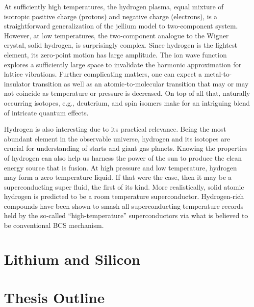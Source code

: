 At sufficiently high temperatures, the hydrogen plasma, equal mixture of isotropic positive charge (protons) and negative charge (electrons), is a straightforward generalization of the jellium model to two-component system. However, at low temperatures, the two-component analogue to the Wigner crystal, solid hydrogen, is surprisingly complex.
Since hydrogen is the lightest element, its zero-point motion has large amplitude. The ion wave function explores a sufficiently large space to invalidate the harmonic approximation for lattice vibrations.
Further complicating matters, one can expect a metal-to-insulator transition as well as an atomic-to-molecular transition that may or may not coincide as temperature or pressure is decreased.
On top of all that, naturally occurring isotopes, e.g., deuterium, and spin isomers make for an intriguing blend of intricate quantum effects.

Hydrogen is also interesting due to its practical relevance. Being the most abundant element in the observable universe, hydrogen and its isotopes are crucial for understanding of starts and giant gas planets. Knowing the properties of hydrogen can also help us harness the power of the sun to produce the clean energy source that is fusion.
At high pressure and low temperature, hydrogen may form a zero temperature liquid. If that were the case, then it may be a superconducting super fluid, the first of its kind. More realistically, solid atomic hydrogen is predicted to be a room temperature superconductor. Hydrogen-rich compounds have been shown to smash all superconducting temperature records held by the so-called ``high-temperature'' superconductors via what is believed to be conventional BCS mechanism.

\section{Lithium and Silicon}

\section{Thesis Outline}